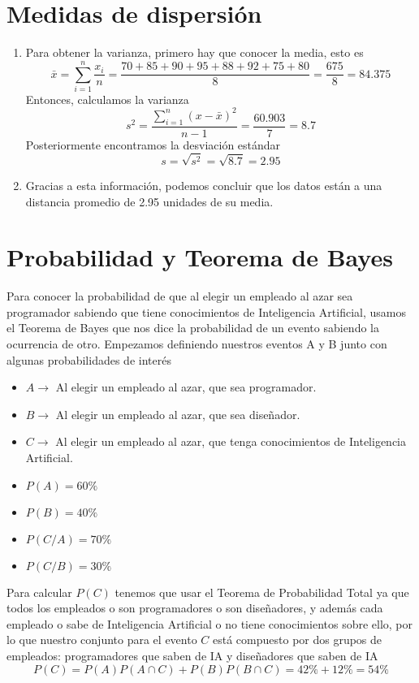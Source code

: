 \documentclass[12pt, letterpaper]{article}
\begin{document}
\section{Medidas de dispersión}
\begin{enumerate}
    \item Para obtener la varianza, primero hay que conocer la media, esto es
    \begin{equation*}
        \bar{x} = \sum_{i = 1}^{n} \frac{x_{i}}{n} = \frac{70+85+90+95+88+92+75+80}{8} = \frac{675}{8} = 84.375
    \end{equation*}
    Entonces, calculamos la varianza
    \begin{equation*}
        s^{2} = \frac{\sum_{i = 1}^{n} (x-\bar{x})^{2}}{n-1} = \frac{60.903}{7} = 8.7
    \end{equation*}
    Posteriormente encontramos la desviación estándar
    \begin{equation*}
        s = \sqrt{s^{2}} = \sqrt{8.7} = 2.95
    \end{equation*}
    \item Gracias a esta información, podemos concluir que los datos están a una distancia promedio de 2.95 unidades de su media.
\end{enumerate}

\section{Probabilidad y Teorema de Bayes}
Para conocer la probabilidad de que al elegir un empleado al azar sea programador sabiendo que tiene conocimientos de Inteligencia Artificial, usamos el Teorema de Bayes que nos dice la probabilidad de un evento sabiendo la ocurrencia de otro. Empezamos definiendo nuestros eventos A y B junto con algunas probabilidades de interés
\begin{itemize}
    \item $ A \rightarrow $ Al elegir un empleado al azar, que sea programador.
    \item $ B \rightarrow $ Al elegir un empleado al azar, que sea diseñador.
    \item $ C \rightarrow $ Al elegir un empleado al azar, que tenga conocimientos de Inteligencia Artificial.
    \item $ P(A) = 60\% $
    \item $ P(B) = 40\% $
    \item $ P(C/A) = 70\% $
    \item $ P(C/B) = 30\% $
\end{itemize}
Para calcular $ P(C) $ tenemos que usar el Teorema de Probabilidad Total ya que todos los empleados o son programadores o son diseñadores, y además cada empleado o sabe de Inteligencia Artificial o no tiene conocimientos sobre ello, por lo que nuestro conjunto para el evento $ C $ está compuesto por dos grupos de empleados: programadores que saben de IA y diseñadores que saben de IA
\begin{equation*}
    P(C) = P(A)P(A \cap C) + P(B)P(B \cap C) = 42\% + 12\% = 54\%
\end{equation*}
\end{document}
